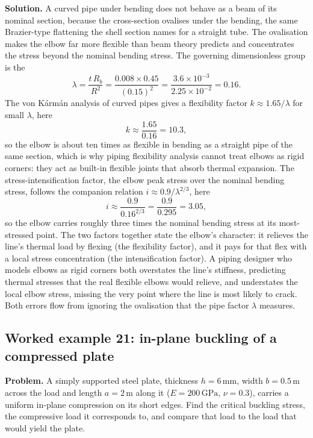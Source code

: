 \textbf{Solution.} A curved pipe under bending does not behave as a beam of
its nominal section, because the cross-section ovalises under the bending,
the same Brazier-type flattening the shell section names for a straight
tube. The ovalisation makes the elbow far more flexible than beam theory
predicts and concentrates the stress beyond the nominal bending stress.
The governing dimensionless group is the 
\[
\lambda = \frac{t\, R_b}{R^2}
= \frac{0.008 \times 0.45}{(0.15)^2}
= \frac{3.6\times 10^{-3}}{2.25\times 10^{-2}}
= 0.16.
\]
The von K\'arm\'an analysis of curved pipes gives a flexibility factor
$k \approx 1.65/\lambda$ for small $\lambda$, here
\[
k \approx \frac{1.65}{0.16} = 10.3,
\]
so the elbow is about ten times as flexible in bending as a straight pipe
of the same section, which is why piping flexibility analysis cannot treat
elbows as rigid corners: they act as built-in flexible joints that absorb
thermal expansion. The stress-intensification factor, the elbow peak
stress over the nominal bending stress, follows the companion relation
$i \approx 0.9/\lambda^{2/3}$, here
\[
i \approx \frac{0.9}{0.16^{2/3}} = \frac{0.9}{0.295} = 3.05,
\]
so the elbow carries roughly three times the nominal bending stress at its
most-stressed point. The two factors together state the elbow's character:
it relieves the line's thermal load by flexing (the flexibility factor),
and it pays for that flex with a local stress concentration (the
intensification factor). A piping designer who models elbows as rigid
corners both overstates the line's stiffness, predicting thermal stresses
that the real flexible elbows would relieve, and understates the local
elbow stress, missing the very point where the line is most likely to
crack. Both errors flow from ignoring the ovalisation that the pipe factor
$\lambda$ measures.

\subsection*{Worked example 21: in-plane buckling of a compressed plate}



\textbf{Problem.} A simply supported steel plate, thickness $h = 6\,\si{
\milli\meter}$, width $b = 0.5\,\si{\meter}$ across the load and length
$a = 2\,\si{\meter}$ along it ($E = 200\,\text{GPa}$, $\nu = 0.3$), carries
a uniform in-plane compression on its short edges. Find the critical
buckling stress, the compressive load it corresponds to, and compare that
load to the load that would yield the plate.

